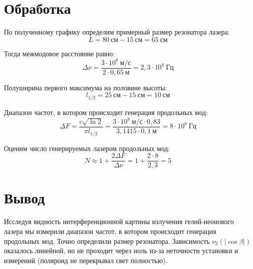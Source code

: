 \documentclass{MagicLabs}
\begin{document}
\section{Обработка}
По полученному графику определим примерный размер резонатора лазера: 
\[
	L = 80~см- 15~см = 65~см 
\]

Тогда межмодовое расстояние равно: 
\[
	\Delta\nu = \dfrac{3 \cdot 10^8~м/с}{2\cdot 0,65~м} = 2,3 \cdot 10^8~Гц
\]


Полуширина первого максимума на половине высоты:
\[
	l_{1/2} = 25~см - 15~см = 10~см
\]


Диапазон частот, в котором происходит генерация продольных мод:
\[
	\Delta F = \dfrac{c\sqrt{\ln2}}{\pi l_{1/2}} = \dfrac{3\cdot 10^8~м/с\cdot0,83}{3,1415\cdot0,1~м} = 8\cdot10^8~Гц
\]


Оценим число генерируемых лазером продольных мод:
\[
	N\approx 1 + \dfrac{2\Delta F}{\Delta\nu} = 1 + \dfrac{2\cdot 8}{2,3} = 5
\]
	

\section{Вывод}
Исследуя видность интерференционной картины излучения гелий-неонового лазера мы измерили
диапазон частот, в котором происходит генерация продольных мод. Точно определили размер резонатора. Зависимость $ \nu_3(|\cos\beta|) $ оказалось линейной, но не проходит
через ноль из-за неточности установки и измерений (поляроид не перекрывал свет полностью).	
\end{document}
